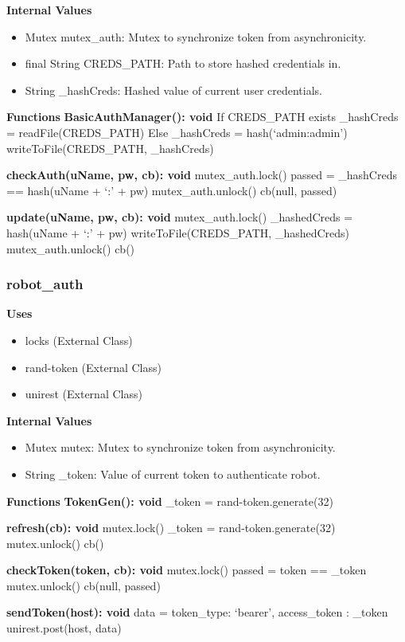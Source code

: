 \documentclass [10pt]{article}
\begin{document}
\textbf{Internal Values}
\begin{itemize}
	\item Mutex mutex\_auth: Mutex to synchronize token from asynchronicity.
	\item final String CREDS\_PATH: Path to store hashed credentials in.
	\item String \_hashCreds: Hashed value of current user credentials.
\end{itemize}

\textbf{Functions}
\textbf{BasicAuthManager(): void}
If CREDS\_PATH exists
	\_hashCreds = readFile(CREDS\_PATH)
Else
	\_hashCreds = hash(‘admin:admin’)
	writeToFile(CREDS\_PATH, \_hashCreds)

\textbf{checkAuth(uName, pw, cb): void}
mutex\_auth.lock()
passed = \_hashCreds == hash(uName + ‘:’ + pw)
mutex\_auth.unlock()
cb(null, passed)

\textbf{update(uName, pw, cb): void}
mutex\_auth.lock()
\_hashedCreds =  hash(uName + ‘:’ + pw)
writeToFile(CREDS\_PATH, \_hashedCreds)
mutex\_auth.unlock()
cb()

\subsubsection{robot\_auth}
\textbf{Uses}
\begin{itemize}
	\item locks (External Class)
	\item rand-token (External Class)
	\item unirest (External Class)
\end{itemize}

\textbf{Internal Values}
\begin{itemize}
	\item Mutex mutex: Mutex to synchronize token from asynchronicity.
	\item String \_token: Value of current token to authenticate robot.
\end{itemize}

\textbf{Functions}
\textbf{TokenGen(): void}
\_token = rand-token.generate(32)

\textbf{refresh(cb): void}
mutex.lock()
\_token = rand-token.generate(32)
mutex.unlock()
cb()

\textbf{checkToken(token, cb): void}
mutex.lock()
passed = token == \_token
mutex.unlock()
cb(null, passed)

\textbf{sendToken(host): void}
data = {
	token\_type: ‘bearer’,
	access\_token : \_token
}
unirest.post(host, data)
\end{document}
